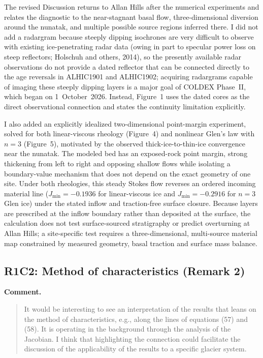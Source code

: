 \documentclass[11pt]{article}
\newcommand{\response}[1]{\noindent\textcolor{responseblue}{#1}}
\begin{document}
\medskip

\response{The revised Discussion returns to Allan Hills after the numerical experiments and relates the diagnostic to the near-stagnant basal flow, three-dimensional diversion around the nunatak, and multiple possible source regions inferred there. I did not add a radargram because steeply dipping isochrones are very difficult to observe with existing ice-penetrating radar data (owing in part to specular power loss on steep reflectors; Holschuh and others, 2014), so the presently available radar observations do not provide a dated reflector that can be connected directly to the age reversals in ALHIC1901 and ALHIC1902; acquiring radargrams capable of imaging these steeply dipping layers is a major goal of COLDEX Phase~II, which began on 1~October~2026. Instead, Figure~1 uses the dated cores as the direct observational connection and states the continuity limitation explicitly.}

\medskip

\response{I also added an explicitly idealized two-dimensional point-margin experiment, solved for both linear-viscous rheology (Figure~4) and nonlinear Glen's law with \(n=3\) (Figure~5), motivated by the observed thick-ice-to-thin-ice convergence near the nunatak. The modeled bed has an exposed-rock point margin, strong thickening from left to right and opposing shallow flows while isolating a boundary-value mechanism that does not depend on the exact geometry of one site. Under both rheologies, this steady Stokes flow reverses an ordered incoming material line (\(J_{\min}=-0.1936\) for linear-viscous ice and \(J_{\min}=-0.2916\) for \(n=3\) Glen ice) under the stated inflow and traction-free surface closure. Because layers are prescribed at the inflow boundary rather than deposited at the surface, the calculation does not test surface-sourced stratigraphy or predict overturning at Allan Hills; a site-specific test requires a three-dimensional, multi-source material map constrained by measured geometry, basal traction and surface mass balance.}

\subsection*{R1C2: Method of characteristics (Remark 2)}

\noindent\textbf{Comment.}
\begin{quote}
It would be interesting to see an interpretation of the results that leans on the method of characteristics, e.g., along the lines of equations (57) and (58). It is operating in the background through the analysis of the Jacobian. I think that highlighting the connection could facilitate the discussion of the applicability of the results to a specific glacier system.
\end{quote}
\end{document}
